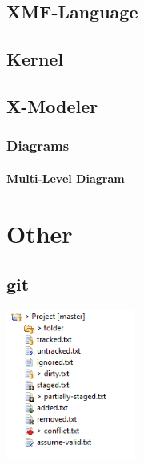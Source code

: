 \documentclass{scrreprt}
\makeatletter
\newcounter{myCounter}[subsubsection]
\newcommand{\specLabel}[1]{%
\myLabel{#1}{Spec}}
\newcommand{\layerOne}[1]{\chapter{#1}}
\newcommand{\layerTwo}[1]{\section{#1}}
\newcommand{\layerThree}[1]{\subsection{#1}}
\newcommand{\layerFour}[1]{\subsubsection{#1}}
\newcommand{\myLabel}[2]{%
		\refstepcounter{myCounter}
		\def\@currentlabel{#2-\thesubsubsection.\arabic{myCounter}}%
		\raisebox{\f@size pt}\phantomsection
		\label{req:#1}
		#2-\thesubsubsection.\arabic{myCounter}}
\newcommand{\myRef}[1]{
  \ref{req:#1}}
\makeatother
\begin{document}
\layerTwo{XMF-Language}
\layerTwo{Kernel}
\layerTwo{X-Modeler}

\layerThree{Diagrams}

\layerFour{Multi-Level Diagram}

%
%


\layerOne{Other}

\layerTwo{git}

\includegraphics[width=120pt]{img/git-IconDecorations.png} %
\end{document}

